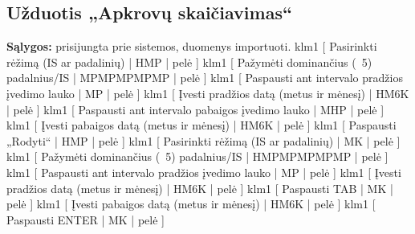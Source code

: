 \subsection{Užduotis „Apkrovų skaičiavimas“}
\textbf{Sąlygos:} prisijungta prie sistemos, duomenys importuoti.
\klm
{
  klm1 [ Pasirinkti rėžimą (IS ar padalinių) | HMP | pelė ]  
  klm1 [ Pažymėti dominančius (~5) padalnius/IS | MPMPMPMPMP | pelė ]  
  klm1 [ Paspausti ant intervalo pradžios įvedimo lauko | MP | pelė ]
  klm1 [ Įvesti pradžios datą (metus ir mėnesį) | HM6K | pelė ]
  klm1 [ Paspausti ant intervalo pabaigos įvedimo lauko | MHP | pelė ]
  klm1 [ Įvesti pabaigos datą (metus ir mėnesį) | HM6K | pelė ]
  klm1 [ Paspausti „Rodyti“ | HMP | pelė ]
}
{
  klm1 [ Pasirinkti rėžimą (IS ar padalinių) | MK | pelė ]  
  klm1 [ Pažymėti dominančius (~5) padalnius/IS | HMPMPMPMPMP | pelė ]  
  klm1 [ Paspausti ant intervalo pradžios įvedimo lauko | MP | pelė ]
  klm1 [ Įvesti pradžios datą (metus ir mėnesį) | HM6K | pelė ]
  klm1 [ Paspausti TAB | MK | pelė ]
  klm1 [ Įvesti pabaigos datą (metus ir mėnesį) | HM6K | pelė ]
  klm1 [ Paspausti ENTER | MK | pelė ]
}

